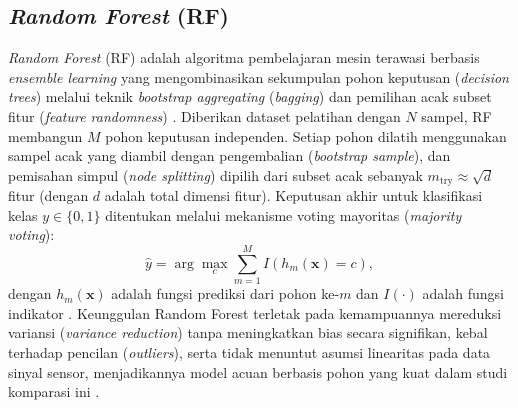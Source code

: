 \subsection{\textit{Random Forest} (RF)}
\textit{Random Forest} (RF) adalah algoritma pembelajaran mesin terawasi berbasis \textit{ensemble learning} yang mengombinasikan sekumpulan pohon keputusan (\textit{decision trees}) melalui teknik \textit{bootstrap aggregating} (\textit{bagging}) dan pemilihan acak subset fitur (\textit{feature randomness}) \cite{Breiman2001,Tyralis2019}. Diberikan dataset pelatihan dengan $N$ sampel, RF membangun $M$ pohon keputusan independen. Setiap pohon dilatih menggunakan sampel acak yang diambil dengan pengembalian (\textit{bootstrap sample}), dan pemisahan simpul (\textit{node splitting}) dipilih dari subset acak sebanyak $m_{\text{try}} \approx \sqrt{d}$ fitur (dengan $d$ adalah total dimensi fitur). Keputusan akhir untuk klasifikasi kelas $y \in \{0, 1\}$ ditentukan melalui mekanisme voting mayoritas (\textit{majority voting}):
\begin{equation}
\hat{y} = \arg\max_{c} \sum_{m=1}^{M} I(h_m(\mathbf{x}) = c),
\end{equation}
dengan $h_m(\mathbf{x})$ adalah fungsi prediksi dari pohon ke-$m$ dan $I(\cdot)$ adalah fungsi indikator \cite{Breiman2001}. Keunggulan Random Forest terletak pada kemampuannya mereduksi variansi (\textit{variance reduction}) tanpa meningkatkan bias secara signifikan, kebal terhadap pencilan (\textit{outliers}), serta tidak menuntut asumsi linearitas pada data sinyal sensor, menjadikannya model acuan berbasis pohon yang kuat dalam studi komparasi ini \cite{Tyralis2019}.

